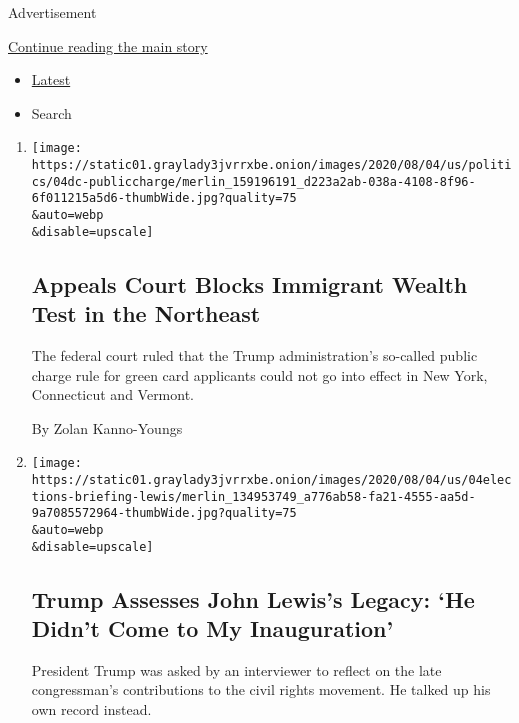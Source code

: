 Advertisement

\protect\hyperlink{after-mid1}{Continue reading the main story}

\begin{itemize}
\tightlist
\item
  \protect\hyperlink{stream-panel}{Latest}
\item
  Search
\end{itemize}

\begin{enumerate}
\def\labelenumi{\arabic{enumi}.}
\item
  \href{/2020/08/04/us/politics/trump-immigration-wealth-test.html}{}

  \texttt{[image: https://static01.graylady3jvrrxbe.onion/images/2020/08/04/us/politics/04dc-publiccharge/merlin\_159196191\_d223a2ab-038a-4108-8f96-6f011215a5d6-thumbWide.jpg?quality=75\\\&auto=webp\\\&disable=upscale]}

  \hypertarget{appeals-court-blocks-immigrant-wealth-test-in-the-northeast}{%
  \subsection{Appeals Court Blocks Immigrant Wealth Test in the
  Northeast}\label{appeals-court-blocks-immigrant-wealth-test-in-the-northeast}}

  The federal court ruled that the Trump administration's so-called
  public charge rule for green card applicants could not go into effect
  in New York, Connecticut and Vermont.

  By Zolan Kanno-Youngs
\item
  \href{/2020/08/04/us/politics/trump-john-lewis-axios.html}{}

  \texttt{[image: https://static01.graylady3jvrrxbe.onion/images/2020/08/04/us/04elections-briefing-lewis/merlin\_134953749\_a776ab58-fa21-4555-aa5d-9a7085572964-thumbWide.jpg?quality=75\\\&auto=webp\\\&disable=upscale]}

  \hypertarget{trump-assesses-john-lewiss-legacy-he-didnt-come-to-my-inauguration-1}{%
  \subsection{Trump Assesses John Lewis's Legacy: `He Didn't Come to My
  Inauguration'}\label{trump-assesses-john-lewiss-legacy-he-didnt-come-to-my-inauguration-1}}

  President Trump was asked by an interviewer to reflect on the late
  congressman's contributions to the civil rights movement. He talked up
  his own record instead.


\end{enumerate}
